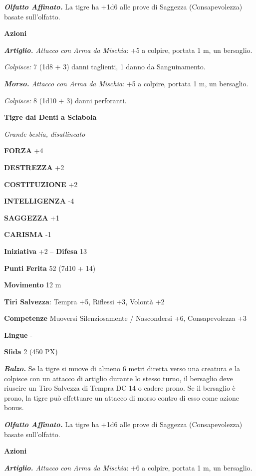 \begin{multicols}{2}
	\textit{\textbf{Olfatto Affinato.}} La tigre ha +1d6 alle prove di Saggezza (Consapevolezza) basate sull'olfatto.

	\textbf{Azioni}

	\textit{\textbf{Artiglio.} Attacco con Arma da Mischia}: +5 a colpire, portata 1 m, un bersaglio.

	\textit{Colpisce:} 7 (1d8 + 3) danni taglienti, 1 danno da Sanguinamento.

	\textit{\textbf{Morso.} Attacco con Arma da Mischia}: +5 a colpire, portata 1 m, un bersaglio.

	\textit{Colpisce:} 8 (1d10 + 3) danni perforanti.

	\medskip\textbf{Tigre dai Denti a Sciabola}

	\textit{Grande bestia, disallineato}

	\textbf{FORZA} +4

	\textbf{DESTREZZA} +2

	\textbf{COSTITUZIONE} +2

	\textbf{INTELLIGENZA} -4

	\textbf{SAGGEZZA} +1

	\textbf{CARISMA} -1

	\textbf{Iniziativa} +2 -- \textbf{Difesa} 13

	\textbf{Punti Ferita} 52 (7d10 + 14)

	\textbf{Movimento} 12 m

	\textbf{Tiri Salvezza}: Tempra +5, Riflessi +3, Volontà +2

	\textbf{Competenze} Muoversi Silenziosamente / Nascondersi +6, Consapevolezza +3

	\textbf{Lingue} -

	\textbf{Sfida} 2 (450 PX)

	\textit{\textbf{Balzo.}} Se la tigre si muove di almeno 6 metri diretta verso una creatura e la colpisce con un attacco di artiglio durante lo stesso turno, il bersaglio deve riuscire un Tiro Salvezza di Tempra DC 14 o cadere prono. Se il bersaglio è prono, la tigre può effettuare un attacco di morso contro di esso come azione bonus.

	\textit{\textbf{Olfatto Affinato.}} La tigre ha +1d6 alle prove di Saggezza (Consapevolezza) basate sull'olfatto.

	\textbf{Azioni}

	\textit{\textbf{Artiglio.} Attacco con Arma da Mischia}: +6 a colpire, portata 1 m, un bersaglio.


\end{multicols}
